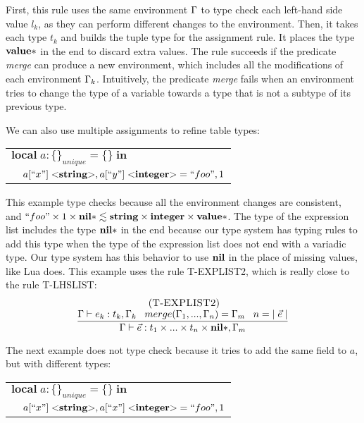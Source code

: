 First, this rule uses the same environment $\Gamma$ to type check each
left-hand side value $l_{k}$, as they can perform different changes
to the environment.
Then, it takes each type $t_{k}$ and builds the tuple type for
the assignment rule.
It places the type $\mathbf{value}{*}$ in the end to discard extra values.
The rule succeeds if the predicate \emph{merge} can
produce a new environment, which includes all the modifications
of each environment $\Gamma_{k}$.
Intuitively, the predicate \emph{merge} fails when an environment
tries to change the type of a variable towards a type that is not
a subtype of its previous type.

We can also use multiple assignments to refine table types:
\begin{center}
\begin{tabular}{ll}
\multicolumn{2}{l}{$\mathbf{local} \; a:\{\}_{unique} = \{\} \; \mathbf{in}$}\\
& \multicolumn{1}{l}{$a[``x"] \; {<}\mathbf{string}{>}, a[``y"] \; {<}\mathbf{integer}{>} = ``foo", 1$}\\
\end{tabular}
\end{center}

This example type checks because all the environment changes are consistent, and
$``foo" \times 1 \times \mathbf{nil}{*} \lesssim \mathbf{string} \times \mathbf{integer} \times \mathbf{value}{*}$.
The type of the expression list includes the type $\mathbf{nil}{*}$ in the end
because our type system has typing rules to add this type when
the type of the expression list does not end with a variadic type.
Our type system has this behavior to use $\mathbf{nil}$ in the place of missing
values, like Lua does.
This example uses the rule \textsc{T-EXPLIST2}, which is really close
to the rule \textsc{T-LHSLIST}:
\[
\begin{array}{c}
\; (\textsc{T-EXPLIST2})\\
\dfrac{\Gamma \vdash e_{k}:t_{k}, \Gamma_{k} \;\;\;
       merge(\Gamma_{1}, ..., \Gamma_{n}) = \Gamma_{m} \;\;\;
       n = |\;\vec{e}\;|}
      {\Gamma \vdash \vec{e}:t_{1} \times ... \times t_{n} \times \mathbf{nil}{*}, \Gamma_{m}}
\end{array}
\]

The next example does not type check because it tries to add
the same field to $a$, but with different types:
\begin{center}
\begin{tabular}{ll}
\multicolumn{2}{l}{$\mathbf{local} \; a:\{\}_{unique} = \{\} \; \mathbf{in}$}\\
& \multicolumn{1}{l}{$a[``x"] \; {<}\mathbf{string}{>}, a[``x"] \; {<}\mathbf{integer}{>} = ``foo", 1$}\\
\end{tabular}
\end{center}

